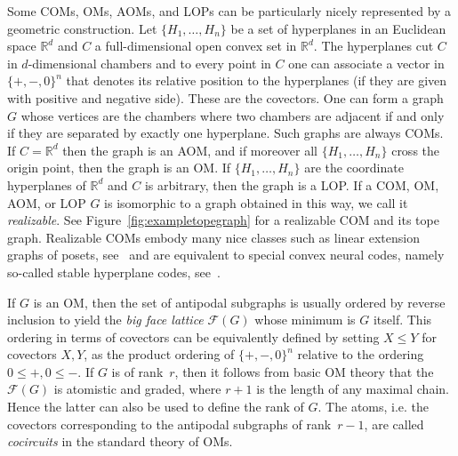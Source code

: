 \documentclass[final,11pt]{article}
\begin{document}
Some COMs, OMs, AOMs, and LOPs can be particularly nicely represented by a geometric construction. Let $\{H_1, \ldots, H_n\}$ be a set of hyperplanes in an Euclidean space $\mathbb{R}^d$ and $C$ a full-dimensional open convex set in $\mathbb{R}^d$. The hyperplanes cut $C$ in $d$-dimensional chambers and to every point in $C$ one can associate a vector in $\{+,-,0\}^n$ that denotes its relative position to the hyperplanes (if they are given with positive and negative side). These are the covectors. One can form a graph $G$ whose vertices are the chambers where two chambers are adjacent if and only if they are separated by exactly one hyperplane. Such graphs are always COMs. If  $C= \mathbb{R}^d$ then the graph is an AOM, and if moreover all $\{H_1, \ldots, H_n\}$ cross the origin point, then the graph is an OM. If $\{H_1, \ldots, H_n\}$ are the coordinate hyperplanes of $\mathbb{R}^d$ and $C$ is arbitrary, then the graph is a LOP. If a COM, OM, AOM, or LOP $G$ is isomorphic to a graph obtained in this way, we call it \emph{realizable}. See Figure~\ref{fig:exampletopegraph} for a realizable COM and its tope graph. Realizable COMs embody many nice classes such as linear extension graphs of posets, see~\cite{Ban-18} and are equivalent to special convex neural codes, namely so-called stable hyperplane codes, see~\cite{itskov2018hyperplane,alex2020oriented}.


If $G$ is an OM, then the set of antipodal subgraphs is usually ordered by reverse inclusion to yield the \emph{big face lattice} $\mathcal{F}(G)$ whose minimum is $G$ itself.
This ordering in terms of covectors can be equivalently defined by setting $X\leq Y$ for covectors $X,Y$, as the product ordering of $\{+,-,0\}^n$ relative to the ordering $0 \leq +, 0 \leq -$.
If $G$ is of rank~$r$, then it follows from basic OM theory that the $\mathcal{F}(G)$ is atomistic and graded, where $r + 1$ is the length of any maximal chain. Hence the latter can also be used to define the rank of $G$. The atoms, i.e. the covectors corresponding to the antipodal subgraphs of rank~$r-1$, are called \emph{cocircuits} in the standard theory of OMs.
\end{document}
